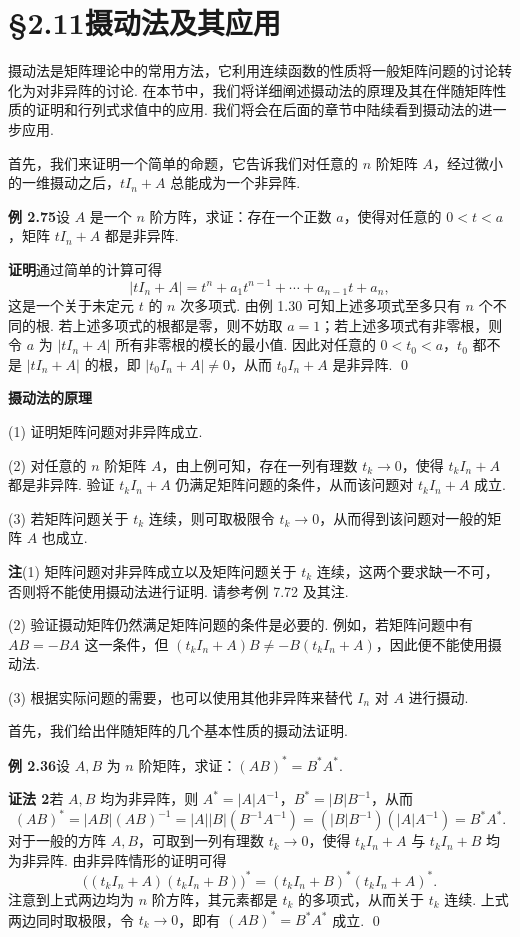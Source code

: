 \documentclass[UTF8, 12pt, fontset=fandol, oneside]{ctexart}
\begin{document}
\section*{§2.11\quad 摄动法及其应用}

摄动法是矩阵理论中的常用方法，它利用连续函数的性质将一般矩阵问题的讨论转化为对非异阵的讨论. 在本节中，我们将详细阐述摄动法的原理及其在伴随矩阵性质的证明和行列式求值中的应用. 我们将会在后面的章节中陆续看到摄动法的进一步应用.

首先，我们来证明一个简单的命题，它告诉我们对任意的 $n$ 阶矩阵 $A$，经过微小的一维摄动之后，$tI_n+A$ 总能成为一个非异阵.

\noindent\textbf{例 2.75}\quad 设 $A$ 是一个 $n$ 阶方阵，求证：存在一个正数 $a$，使得对任意的 $0<t<a$，矩阵 $tI_n+A$ 都是非异阵.

\noindent\textbf{证明}\quad 通过简单的计算可得
\[
|tI_n+A|=t^n+a_1t^{n-1}+\cdots+a_{n-1}t+a_n,
\]
这是一个关于未定元 $t$ 的 $n$ 次多项式. 由例 1.30 可知上述多项式至多只有 $n$ 个不同的根. 若上述多项式的根都是零，则不妨取 $a=1$；若上述多项式有非零根，则令 $a$ 为 $|tI_n+A|$ 所有非零根的模长的最小值. 因此对任意的 $0<t_0<a$，$t_0$ 都不是 $|tI_n+A|$ 的根，即 $|t_0I_n+A|\ne0$，从而 $t_0I_n+A$ 是非异阵. \qed

\noindent\textbf{摄动法的原理}

(1) 证明矩阵问题对非异阵成立.

(2) 对任意的 $n$ 阶矩阵 $A$，由上例可知，存在一列有理数 $t_k\to0$，使得 $t_kI_n+A$ 都是非异阵. 验证 $t_kI_n+A$ 仍满足矩阵问题的条件，从而该问题对 $t_kI_n+A$ 成立.

(3) 若矩阵问题关于 $t_k$ 连续，则可取极限令 $t_k\to0$，从而得到该问题对一般的矩阵 $A$ 也成立.

\noindent\textbf{注}\quad (1) 矩阵问题对非异阵成立以及矩阵问题关于 $t_k$ 连续，这两个要求缺一不可，否则将不能使用摄动法进行证明. 请参考例 7.72 及其注.

(2) 验证摄动矩阵仍然满足矩阵问题的条件是必要的. 例如，若矩阵问题中有 $AB=-BA$ 这一条件，但 $(t_kI_n+A)B\ne-B(t_kI_n+A)$，因此便不能使用摄动法.

(3) 根据实际问题的需要，也可以使用其他非异阵来替代 $I_n$ 对 $A$ 进行摄动.

首先，我们给出伴随矩阵的几个基本性质的摄动法证明.

\noindent\textbf{例 2.36}\quad 设 $A,B$ 为 $n$ 阶矩阵，求证：$(AB)^*=B^*A^*$.

\noindent\textbf{证法 2}\quad 若 $A,B$ 均为非异阵，则 $A^*=|A|A^{-1}$，$B^*=|B|B^{-1}$，从而
\[
(AB)^*=|AB|(AB)^{-1}=|A||B|(B^{-1}A^{-1})=(|B|B^{-1})(|A|A^{-1})=B^*A^*.
\]
对于一般的方阵 $A,B$，可取到一列有理数 $t_k\to0$，使得 $t_kI_n+A$ 与 $t_kI_n+B$ 均为非异阵. 由非异阵情形的证明可得
\[
\bigl((t_kI_n+A)(t_kI_n+B)\bigr)^*=(t_kI_n+B)^*(t_kI_n+A)^*.
\]
注意到上式两边均为 $n$ 阶方阵，其元素都是 $t_k$ 的多项式，从而关于 $t_k$ 连续. 上式两边同时取极限，令 $t_k\to0$，即有 $(AB)^*=B^*A^*$ 成立. \qed
\end{document}
